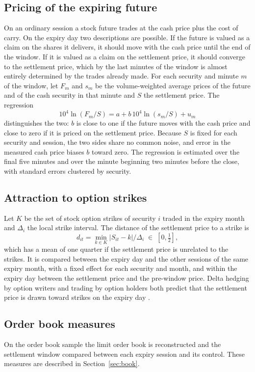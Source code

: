 \subsection{Pricing of the expiring future}

On an ordinary session a stock future trades at the cash price plus the cost of carry. On the
expiry day two descriptions are possible. If the future is valued as a claim on the shares it
delivers, it should move with the cash price until the end of the window. If it is valued as a
claim on the settlement price, it should converge to the settlement price, which by the last
minutes of the window is almost entirely determined by the trades already made. For each
security and minute $m$ of the window, let $F_m$ and $s_m$ be the volume-weighted average
prices of the future and of the cash security in that minute and $S$ the settlement price. The
regression
\begin{equation}
  10^{4}\ln(F_m / S) = a + b \, 10^{4}\ln(s_m / S) + u_m
\end{equation}
distinguishes the two: $b$ is close to one if the future moves with the cash price and close to
zero if it is priced on the settlement price. Because $S$ is fixed for each security and session,
the two sides share no common noise, and error in the measured cash price biases $b$ toward
zero. The regression is estimated over the final five minutes and over the minute beginning two
minutes before the close, with standard errors clustered by security.

\subsection{Attraction to option strikes}

Let $K$ be the set of stock option strikes of security $i$ traded in the expiry month and
$\Delta_i$ the local strike interval. The distance of the settlement price to a strike is
\begin{equation}
  d_{it} = \min_{k \in K} \bigl|S_{it} - k\bigr| / \Delta_i \;\in\; [0, \tfrac{1}{2}],
\end{equation}
which has a mean of one quarter if the settlement price is unrelated to the strikes. It is
compared between the expiry day and the other sessions of the same expiry month, with a
fixed effect for each security and month, and within the expiry day between the settlement
price and the pre-window price. Delta hedging by option writers and trading by option holders
both predict that the settlement price is drawn toward strikes on the expiry day
\citep{ni2005stock}.

\subsection{Order book measures}

On the order book sample the limit order book is reconstructed and the settlement window
compared between each expiry session and its control. These measures are described in
Section~\ref{sec:book}.
